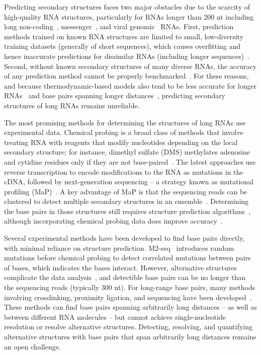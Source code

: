 \documentclass[main.tex]{subfiles}
\begin{document}
Predicting secondary structures faces two major obstacles due to the scarcity of high-quality RNA structures, particularly for RNAs longer than 200 nt including long non-coding~\cite{Quinn2016}, messenger~\cite{Lange2012}, and viral genomic~\cite{Nicholson2015} RNAs.
First, prediction methods trained on known RNA structures are limited to small, low-diversity training datasets (generally of short sequences), which causes overfitting and hence inaccurate predictions for dissimilar RNAs (including longer sequences)~\cite{Flamm2022,Sato2023}.
Second, without known secondary structures of many diverse RNAs, the accuracy of any prediction method cannot be properly benchmarked~\cite{Lange2012,Mathews2019}.
For these reasons, and because thermodynamic-based models also tend to be less accurate for longer RNAs~\cite{Nicholson2015} and base pairs spanning longer distances~\cite{Doshi2004}, predicting secondary structures of long RNAs remains unreliable.

The most promising methods for determining the structures of long RNAs use experimental data.
Chemical probing is a broad class of methods that involve treating RNA with reagents that modify nucleotides depending on the local secondary structure; for instance, dimethyl sulfate (DMS) methylates adenosine and cytidine residues only if they are not base-paired~\cite{Kubota2015}.
The latest approaches use reverse transcription to encode modifications to the RNA as mutations in the cDNA, followed by next-generation sequencing -- a strategy known as mutational profiling (MaP)~\cite{Siegfried2014,Zubradt2016}.
A key advantage of MaP is that the sequencing reads can be clustered to detect multiple secondary structures in an ensemble~\cite{Tomezsko2020,Morandi2021}.
Determining the base pairs in those structures still requires structure prediction algorithms~\cite{Mathews2004a}, although incorporating chemical probing data does improve accuracy~\cite{Cordero2012,Sloma2015}.

Several experimental methods have been developed to find base pairs directly, with minimal reliance on structure prediction.
M2-seq~\cite{Cheng2017} introduces random mutations before chemical probing to detect correlated mutations between pairs of bases, which indicates the bases interact.
However, alternative structures complicate the data analysis~\cite{Cordero2015}, and detectible base pairs can be no longer than the sequencing reads (typically 300 nt).
For long-range base pairs, many methods involving crosslinking, proximity ligation, and sequencing have been developed~\cite{Kudla2020}.
These methods can find base pairs spanning arbitrarily long distances -- as well as between different RNA molecules -- but cannot achieve single-nucleotide resolution or resolve alternative structures.
Detecting, resolving, and quantifying alternative structures with base pairs that span arbitrarily long distances remains an open challenge.
\end{document}
